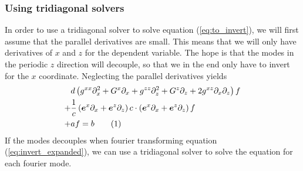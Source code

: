 \documentclass[12pt]{article}
\def\L{\left}
\def\R{\right}
\newcommand{\ve}[1]{\ensuremath{\boldsymbol{#1}}}
\newcommand\numberthis{\addtocounter{equation}{1}\tag{\theequation}}
\begin{document}
\subsubsection{Using tridiagonal solvers}
%
In order to use a tridiagonal solver to solve equation (\ref{eq:to_invert}), we
will first assume that the parallel derivatives are small. This means that we
will only have derivatives of $x$ and $z$ for the dependent variable. The hope
is that the modes in the periodic $z$ direction will decouple, so that we in the
end only have to invert for the $x$ coordinate. Neglecting the parallel
derivatives yields
%
\begin{align*}
    \, &d
    \L(    g^{xx} \partial_x^2
         + G^x \partial_x
         + g^{zz} \partial_z^2
         + G^z \partial_z
         + 2g^{xz} \partial_x \partial_z
    \R)
    f
    \\
%
    +& \frac{1}{c}\L(
          \ve{e}^x \partial_x
       +  \ve{e}^z \partial_z
    \R)
    c
    \cdot
       \L(
          \ve{e}^x \partial_x
       +  \ve{e}^z \partial_z
       \R)
       f
       \\
%
    +& af = b
    \numberthis
    \label{eq:invert_expanded}
\end{align*}
%
If the modes decouples when fourier transforming equation
(\ref{eq:invert_expanded}), we can use a tridiagonal solver to solve the
equation for each fourier mode.
\end{document}
